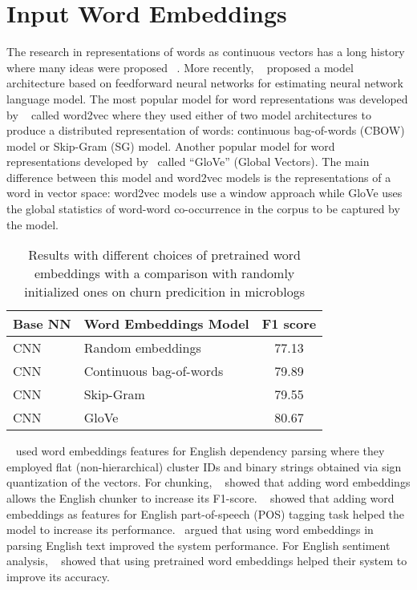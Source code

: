 \documentclass[11pt,letterpaper]{article}
\begin{document}
\section{Input Word Embeddings}

The research in representations of words as continuous vectors has a long history where many ideas were proposed ~\cite{hinton1985learning}. More recently, ~\cite{bengio2003} proposed a model architecture based on feedforward neural networks for estimating neural network language model. The most popular model for word representations was developed by ~\cite{mikolov2013} called word2vec where they used either of two model architectures to produce a distributed representation of words: continuous bag-of-words (CBOW) model or Skip-Gram (SG) model. Another popular model for word representations developed by~\cite{pennington} called \enquote{GloVe} (Global Vectors). The main difference between this model and word2vec models is the representations of a word in vector space: word2vec models use a window approach while GloVe uses the global statistics of word-word co-occurrence in the corpus to be captured by the model.


\begin{table}
\small
\centering
\begin{tabular}{|l|l|c|}
\hline \bf Base NN & \bf Word Embeddings Model & \bf F1 score \\ \hline

CNN & Random embeddings & 77.13 \\
CNN & Continuous bag-of-words & 79.89 \\
CNN & Skip-Gram & 79.55 \\
CNN & GloVe & 80.67 \\

\hline
\end{tabular}
\caption{Results with different choices of pretrained word embeddings with a comparison with randomly initialized ones on churn predicition in microblogs}
\end{table}


~\cite{hisamoto2013empirical} used word embeddings features for English dependency parsing where they employed flat (non-hierarchical) cluster IDs and binary strings obtained via sign quantization of the vectors. For chunking, ~\cite{turian2010word} showed that adding word embeddings allows the English chunker to increase its F1-score. ~\cite{huang2014learning} showed that adding word embeddings as features for English part-of-speech (POS) tagging task helped the model to increase its performance.~\cite{bansal2014tailoring} argued that using word embeddings in parsing English text improved the system performance. For English sentiment analysis, ~\cite{kim} showed that using pretrained word embeddings helped their system to improve its accuracy. 
\end{document}
